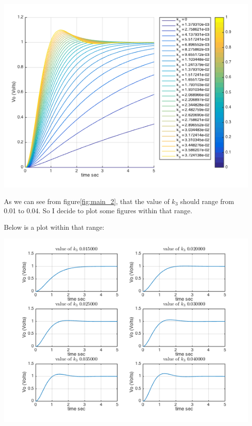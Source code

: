 \documentclass[11pt]{scrartcl}
\begin{document}
\begin{minipage}[t]{\linewidth}

{
\includegraphics[scale = 0.7]{main_4.png}
\label{fig:main_2}
}
\end{minipage}
\medskip

As we can see from figure\ref{fig:main_2}, that the value of ${k_3}$ should range from 0.01 to 0.04. So I decide to plot some figures within that range.

Below is a plot within that range:\\
\begin{minipage}[t]{\linewidth}

{
\includegraphics[scale = 0.7]{main_5.png}
}
\end{minipage}
\medskip
\end{document}
